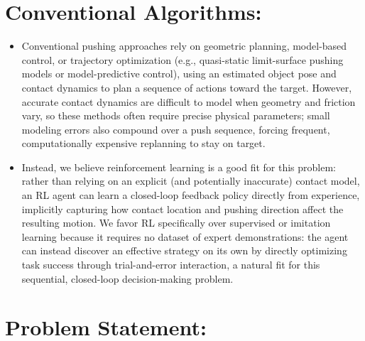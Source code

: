 \documentclass[11pt,onecolumn]{IEEEtran}
\begin{document}
\section*{Conventional Algorithms:}

\begin{itemize}

    \item
    Conventional pushing approaches rely on geometric planning, model-based
    control, or trajectory optimization (e.g., quasi-static limit-surface
    pushing models or model-predictive control), using an estimated object pose
    and contact dynamics to plan a sequence of actions toward the target.
    However, accurate contact dynamics are difficult to model when geometry and
    friction vary, so these methods often require precise physical parameters;
    small modeling errors also compound over a push sequence, forcing frequent,
    computationally expensive replanning to stay on target.

    \item
    Instead, we believe reinforcement learning is a good fit for this problem:
    rather than relying on an explicit (and potentially inaccurate) contact
    model, an RL agent can learn a closed-loop feedback policy directly from
    experience, implicitly capturing how contact location and pushing direction
    affect the resulting motion. We favor RL specifically over supervised or
    imitation learning because it requires no dataset of expert demonstrations:
    the agent can instead discover an effective strategy on its own by directly
    optimizing task success through trial-and-error interaction, a natural fit
    for this sequential, closed-loop decision-making problem.

\end{itemize}



\section*{Problem Statement:}
\end{document}
